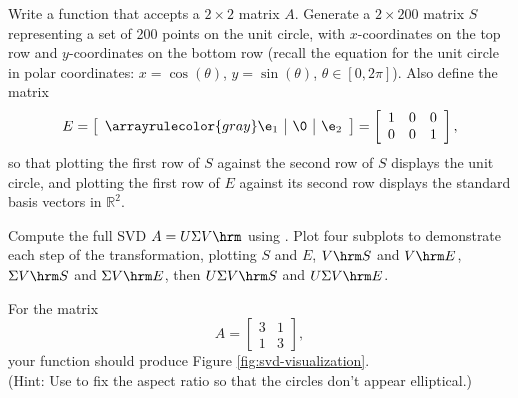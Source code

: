 \begin{problem} %
Write a function that accepts a $2 \times 2$ matrix $A$.
Generate a $2 \times 200$ matrix $S$ representing a set of 200 points on the unit circle, with $x$-coordinates on the top row and $y$-coordinates on the bottom row (recall the equation for the unit circle in polar coordinates:
$x = \cos(\theta)$, $y = \sin(\theta)$, $\theta\in[0,2\pi]$).
Also define the matrix
\[
E =
\left[\begin{array}{c|c|c}
\arrayrulecolor{gray}
\e_1 & \0 & \e_2
\end{array}\right]
=
\left[\begin{array}{ccc} 1 & 0 & 0 \\ 0 & 0 & 1 \end{array}\right],
\]
so that plotting the first row of $S$ against the second row of $S$ displays the unit circle, and plotting the first row of $E$ against its second row displays the standard basis vectors in $\mathbb{R}^2$.

Compute the full SVD $A = U\Sigma V\hrm$ using .
Plot four subplots to demonstrate each step of the transformation, plotting $S$ and $E$, $V\hrm S$ and $V\hrm E$, $\Sigma V\hrm S$ and $\Sigma V\hrm E$, then $U\Sigma V\hrm S$ and $U \Sigma V\hrm E$.

For the matrix \[A =  \left[\begin{array}{cc}3 & 1\\1 & 3\end{array}\right],\]
your function should produce Figure \ref{fig:svd-visualization}.
\\
(Hint: Use  to fix the aspect ratio so that the circles don't appear elliptical.)
\end{problem}

